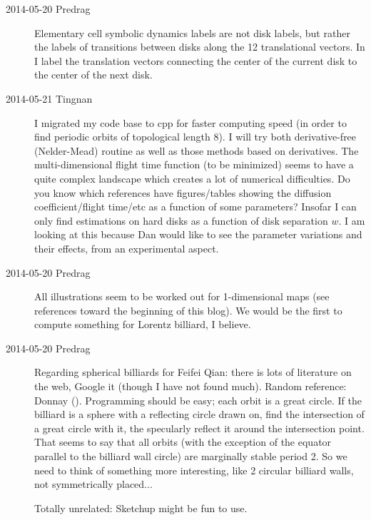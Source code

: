 \begin{description}
\item[2014-05-20 Predrag]
Elementary cell symbolic dynamics labels are not disk labels, but rather
the labels of transitions between disks along the 12 translational
vectors. In  I label the
translation vectors connecting the center of the current disk to the
center of the next disk.

\item[2014-05-21 Tingnan]
I migrated my code base to cpp for
faster computing speed (in order to find periodic orbits of topological
length 8). I will try both derivative-free (Nelder-Mead) routine as well
as those methods based on derivatives. The multi-dimensional flight time
function (to be minimized) seems to have a quite complex landscape which
creates a lot of numerical difficulties. Do you know which references
have figures/tables showing the diffusion coefficient/flight time/etc as
a function of some parameters? Insofar I can only find estimations on
hard disks as a function of disk separation $w$. I am looking at this
because Dan would like to see the parameter variations and their effects,
from an experimental aspect.

\item[2014-05-20 Predrag]
All illustrations seem to be worked out for 1-dimensional maps (see
references toward the beginning of this blog). We would be the first to
compute something for Lorentz billiard, I believe.

\item[2014-05-20 Predrag]
Regarding spherical billiards for Feifei Qian: there is lots of
literature on the web, Google it (though I have not found much). Random
reference: Donnay
().
Programming should be easy; each orbit is a great circle. If the billiard
is a sphere with a reflecting circle drawn on, find the intersection of a
great circle with it, the specularly reflect it around the intersection
point. That seems to say that all orbits (with the exception of the
equator parallel to the billiard wall circle) are marginally stable
period 2. So we need to think of something more interesting, like 2
circular billiard walls, not symmetrically placed...

Totally unrelated:
 {Sketchup}
might be fun to use.



\end{description}
